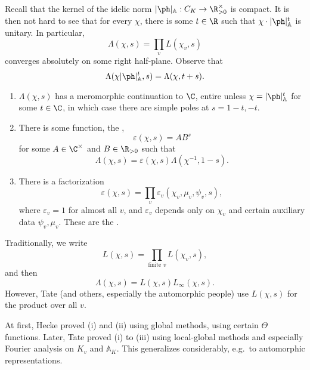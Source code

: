 \documentclass[a4paper]{article}
\newcommand\A{\mathbb{A}}
\begin{document}
Recall that the kernel of the idelic norm $|\ph|_\A: C_K \to \R^\times_{>0}$ is compact. It is then not hard to see that for every $\chi$, there is some $t \in \R$ such that $\chi \cdot |\ph|_\A^t$ is unitary. In particular,
\[
  \Lambda(\chi, s) = \prod_v L(\chi_v, s)
\]
converges absolutely on some right half-plane. Observe that
\[
  \Lambda(\chi |\ph|_\A^t, s) = \Lambda(\chi, t + s).
\]
\begin{thm}\leavevmode
  \begin{enumerate}
    \item $\Lambda(\chi, s)$ has a meromorphic continuation to $\C$, entire unless $\chi = |\ph|_\A^t$ for some $t \in \C$, in which case there are simple poles at $s = 1 - t, -t$.
    \item There is some function, the ,
      \[
        \varepsilon(\chi, s) = A B^s
      \]
      for some $A \in \C^\times$ and $B \in \R_{>0}$ such that
      \[
        \Lambda(\chi, s) = \varepsilon(\chi, s) \Lambda(\chi^{-1}, 1 - s).
      \]
    \item There is a factorization
      \[
        \varepsilon(\chi, s) = \prod_v \varepsilon_v(\chi_v, \mu_v, \psi_v, s),
      \]
      where $\varepsilon_v = 1$ for almost all $v$, and $\varepsilon_v$ depends only on $\chi_v$ and certain auxiliary data $\psi_v, \mu_v$. These are the .
  \end{enumerate}
\end{thm}
Traditionally, we write
\[
  L(\chi, s) = \prod_{\text{finite } v} L(\chi_v, s),
\]
and then
\[
  \Lambda(\chi, s) = L(\chi, s) L_\infty(\chi, s).
\]
However, Tate (and others, especially the automorphic people) use $L(\chi, s)$ for the product over all $v$.

At first, Hecke proved (i) and (ii) using global methods, using certain $\Theta$ functions. Later, Tate proved (i) to (iii) using local-global methods and especially Fourier analysis on $K_v$ and $\A_K$. This generalizes considerably, e.g.\ to automorphic representations.
\end{document}
